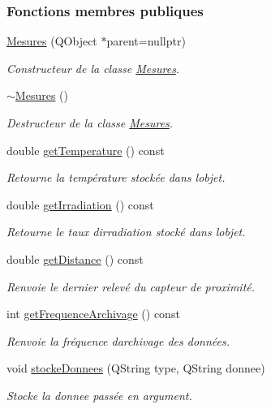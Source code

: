 \subsubsection*{Fonctions membres publiques}
\begin{DoxyCompactItemize}
\item 
\hyperlink{class_mesures_aa24ed1e055242fab5adab3f8f057c9b1}{Mesures} (Q\+Object $\ast$parent=nullptr)
\begin{DoxyCompactList}\small\item\em Constructeur de la classe \hyperlink{class_mesures}{Mesures}. \end{DoxyCompactList}\item 
\hyperlink{class_mesures_a4bb192b80fbf2c0f9aea5911ce29c652}{$\sim$\+Mesures} ()
\begin{DoxyCompactList}\small\item\em Destructeur de la classe \hyperlink{class_mesures}{Mesures}. \end{DoxyCompactList}\item 
double \hyperlink{class_mesures_a5e5e61c6bbdd2fd891b66ee494183dcd}{get\+Temperature} () const
\begin{DoxyCompactList}\small\item\em Retourne la température stockée dans l\textquotesingle{}objet. \end{DoxyCompactList}\item 
double \hyperlink{class_mesures_af260c8f685e3519681b3ca0086d70b31}{get\+Irradiation} () const
\begin{DoxyCompactList}\small\item\em Retourne le taux d\textquotesingle{}irradiation stocké dans l\textquotesingle{}objet. \end{DoxyCompactList}\item 
double \hyperlink{class_mesures_aa40d78428855bab861cc9a57582c8d42}{get\+Distance} () const
\begin{DoxyCompactList}\small\item\em Renvoie le dernier relevé du capteur de proximité. \end{DoxyCompactList}\item 
int \hyperlink{class_mesures_ae969e38402b8d19fe9b484f368200578}{get\+Frequence\+Archivage} () const
\begin{DoxyCompactList}\small\item\em Renvoie la fréquence d\textquotesingle{}archivage des données. \end{DoxyCompactList}\item 
void \hyperlink{class_mesures_a77652c2332a9234bf08b463d1d389aa5}{stocke\+Donnees} (Q\+String type, Q\+String donnee)
\begin{DoxyCompactList}\small\item\em Stocke la donnee passée en argument. \end{DoxyCompactList}\end{DoxyCompactItemize}
